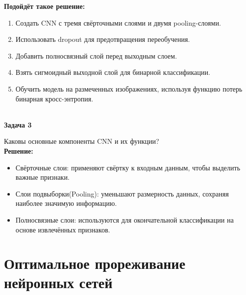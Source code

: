\begin{description}
\textbf{Подойдёт такое решение:}

\begin{enumerate}
    \item Создать CNN с тремя свёрточными слоями и двумя pooling-слоями.
    \item Использовать dropout для предотвращения переобучения.
    \item Добавить полносвязный слой перед выходным слоем.
    \item Взять сигмоидный выходной слой для бинарной классификации.
    \item Обучить модель на размеченных изображениях, используя функцию потерь бинарная кросс-энтропия.\end{enumerate}\\

\textbf{Задача 3}

Каковы основные компоненты CNN и их функции?\\
\textbf{Решение:}
\begin{itemize}
    \item Свёрточные слои: применяют свёртку к входным данным, чтобы выделить важные признаки.
    \item Слои подвыборки(Pooling): уменьшают размерность данных, сохраняя наиболее значимую информацию.
    \item Полносвязные слои: используются для окончательной классификации на основе извлечённых признаков.
\end{itemize}

\end{description}



\section*{Оптимальное прореживание нейронных сетей}

